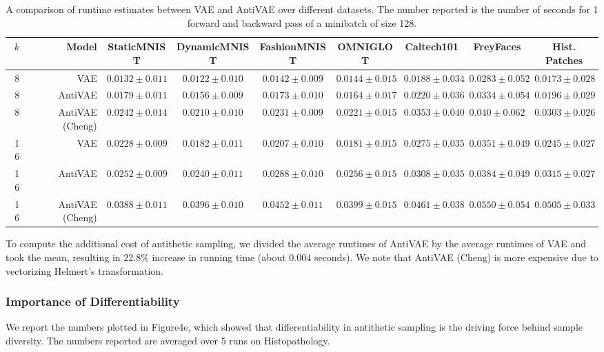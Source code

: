 \begin{table}
\tiny
\centering
\begin{tabular}{r|r|ccccccc}
    $k$ & Model & StaticMNIST & DynamicMNIST & FashionMNIST & OMNIGLOT & Caltech101  & FreyFaces & Hist. Patches \\
    \toprule
    8 & VAE & $0.0132 \pm 0.011$ & $0.0122 \pm 0.010$ & $0.0142 \pm 0.009$ & $0.0144 \pm 0.015$ & $0.0188 \pm 0.034$ & $0.0283 \pm 0.052$ & $0.0173 \pm 0.028$ \\
    8 & AntiVAE & $0.0179 \pm 0.011$ & $0.0156 \pm 0.009$ & $0.0173 \pm 0.010$ & $0.0164 \pm 0.017$ & $0.0220 \pm 0.036$ & $0.0334 \pm 0.054$ & $0.0196 \pm 0.029$ \\
    8 & AntiVAE (Cheng) & $0.0242 \pm 0.014$ & $0.0210 \pm 0.010$ & $0.0231 \pm 0.009$ & $0.0221 \pm 0.015$ & $0.0353 \pm 0.040$ & $0.040 \pm 0.062$ & $0.0303 \pm 0.026$\\
    \hline
    16 & VAE & $0.0228 \pm 0.009$ & $0.0182 \pm 0.011$ & $0.0207 \pm 0.010$ & $0.0181 \pm 0.015$ & $0.0275 \pm 0.035$ & $0.0351 \pm 0.049$ & $0.0245 \pm 0.027$\\
    16 & AntiVAE & $0.0252 \pm 0.009$ & $0.0240 \pm 0.011$ & $0.0288 \pm 0.010$ & $0.0256 \pm 0.015$ & $0.0308 \pm 0.035$ & $0.0384 \pm 0.049$ & $0.0315 \pm 0.027$ \\
    16 & AntiVAE (Cheng) & $0.0388 \pm 0.011$ & $0.0396 \pm 0.010$ & $0.0452 \pm 0.011$ & $0.0399 \pm 0.015$ & $0.0461 \pm 0.038$ & $0.0550 \pm 0.054$ & $0.0505 \pm 0.033$ \\
\end{tabular}
\caption{A comparison of runtime estimates between VAE and AntiVAE over different datasets. The number reported is the number of seconds for 1 forward and backward pass of a minibatch of size 128.}
\label{table:runtime}
\end{table}

To compute the additional cost of antithetic sampling, we divided the average runtimes of AntiVAE by the average runtimes of VAE and took the mean, resulting in 22.8\% increase in running time (about 0.004 seconds). We note that AntiVAE (Cheng) is more expensive due to vectorizing Helmert's transformation.

\subsubsection{Importance of Differentiability}
We report the numbers plotted in Figure4e, which showed that differentiability in antithetic sampling is the driving force behind sample diversity. The numbers reported are averaged over 5 runs on Histopathology.

